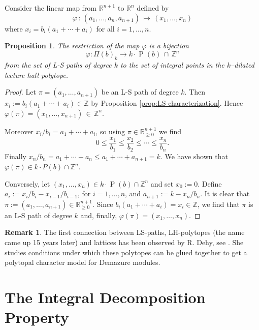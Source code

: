 \documentclass[12pt, a4paper]{amsart}   	%
\numberwithin{equation}{section}
\theoremstyle{plain}
\newtheorem{proposition}[theorem]{Proposition}
\theoremstyle{definition}
\newtheorem{remark}[theorem]{Remark}
\newcommand{\R}{{\mathbb R}}
\newcommand{\Z}{{\mathbb Z}}
\DeclareMathOperator{\LH}{P}
\newcommand{\ZZ}{\mathbb{Z}}
\newcommand{\RR}{\mathbb{R}}
\begin{document}
Consider the linear map from $\R^{n+1}$ to $\R^n$ defined by
\[
\varphi \,:\, (a_1, \ldots, a_n, a_{n+1})
\,\longmapsto\, (x_1, \ldots, x_n)
\]
where $x_i = b_i(a_1 + \cdots + a_i)$ for all $i=1,\ldots,n$.

\begin{proposition}\label{prop_bijection-LS-LH}
    The restriction of the map $\varphi$ is a bijection
    \[
    \varphi:\Pi(b)_k \longrightarrow k\cdot\LH(b)\,\cap\,\Z^n
    \]
    from the set of L-S paths of degree $k$ to the set of integral points in the $k$--dilated lecture hall polytope.
\end{proposition}
\begin{proof} Let $\pi = (a_1,\ldots,a_{n+1})$ be an L-S path of degree $k$. Then $x_i := b_i(a_1 + \cdots + a_i)\in\ZZ$ by Proposition \ref{prop:LS-characterization}. Hence $\varphi(\pi) = (x_1, \ldots, x_{n+1})\,\in\,\Z^n$.

Moreover $x_i /b_i = a_1 + \cdots + a_i$, so using $\pi\in\RR^{n+1}_{\geq 0}$ we find
\[
\displaystyle 0\leq \frac{x_1}{b_1} \leq \frac{x_2}{b_2} \leq \cdots \leq \frac{x_n}{b_n}.
\]
Finally $x_n / b_n = a_1 + \cdots + a_n \leq a_1 + \cdots + a_{n+1}= k$. We have shown that $\varphi(\pi)\in k\cdot P(b) \cap \ZZ^n$.

Conversely, let $(x_1, \ldots, x_n)\in k\cdot\LH(b)\cap\Z^n$ and set $x_0 := 0$. Define $a_i := x_i / b_i - x_{i-1} / b_{i-1}$, for $i = 1,\ldots, n$, and $a_{n+1} := k - x_n / b_n$. It is clear that $\pi := (a_1, \ldots, a_{n+1})\in \RR^{n+1}_{\geq 0}$. Since $b_i(a_1 + \cdots + a_i) = x_i\in\ZZ$, we find that $\pi$ is an L-S path of degree $k$ and, finally, $\varphi(\pi) = (x_1, \ldots, x_n)$.
\end{proof}
\begin{remark}\rm
The first connection between LS-paths, LH-polytopes (the name came up 15 years later) and lattices has been observed by R. Dehy,
see \cite[Section 4.2.2]{Dehy}. She studies conditions under which these polytopes can be glued together to get a polytopal character model for Demazure modules.   
\end{remark}


\section{The Integral Decomposition Property}\label{Sec:3}
\end{document}
